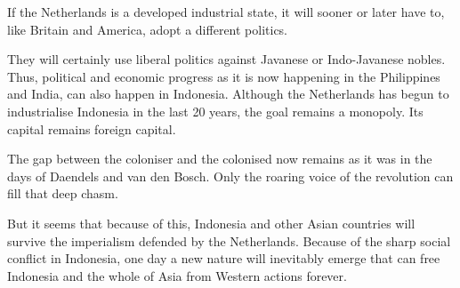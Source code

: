 If the Netherlands is a developed industrial state, it will sooner or later 
have to, like Britain and America, adopt a different politics.\vskip 0.2in

They will certainly use liberal politics against Javanese or Indo-Javanese nobles. 
Thus, political and economic progress as it is now happening in the Philippines 
and India, can also happen in Indonesia. Although the Netherlands has begun to 
industrialise Indonesia in the last 20 years, the goal remains a monopoly. Its capital remains foreign capital.\vskip 0.2in

The gap between the coloniser and the colonised now remains as it was in the days 
of Daendels and van den Bosch. Only the roaring voice of the revolution can fill that deep chasm.\vskip 0.2in

But it seems that because of this, Indonesia and other Asian countries 
will survive the imperialism defended by the Netherlands. Because of the 
sharp social conflict in Indonesia, one day a new nature will inevitably 
emerge that can free Indonesia and the whole of Asia from Western actions forever.\vskip 0.2in

